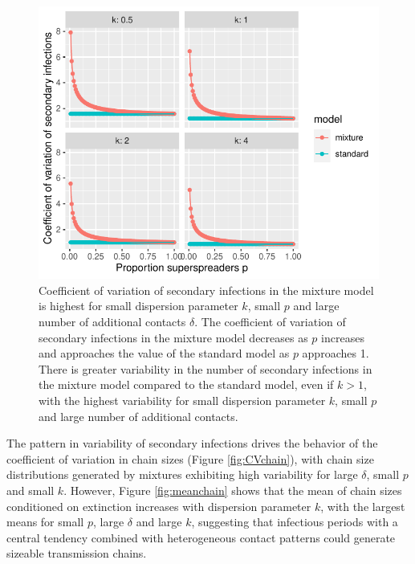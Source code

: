 \documentclass{imammb}
\numberwithin{equation}{section}
\begin{document}
{ \begin{figure}
    \centering
    \includegraphics{Figure4.pdf}
    \caption{Coefficient of variation of secondary infections in the mixture model is highest for small dispersion parameter $k$, small $p$ and large number of additional contacts $\delta$. The coefficient of variation of secondary infections in the mixture model decreases as $p$ increases and approaches the value of the standard model as $p$ approaches 1. There is greater variability in the number of secondary infections in the mixture model compared to the standard model, even if $k>1$, with the highest variability for small dispersion parameter $k$, small $p$ and large number of additional contacts.  }
    \label{fig:CVcases}
\end{figure}

 
 The pattern in variability of secondary infections drives the behavior of the coefficient of variation in chain sizes (Figure \ref{fig:CVchain}), with chain size distributions generated by mixtures exhibiting high variability for large $\delta$,  small $p$ and small $k$. However, Figure \ref{fig:meanchain} shows that the mean of chain sizes conditioned on extinction increases with dispersion parameter $k$, with the largest means for small $p$, large $\delta$ and large $k$, suggesting that infectious periods with a central tendency combined with heterogeneous contact patterns could generate sizeable transmission chains. 
 
}
\end{document}
